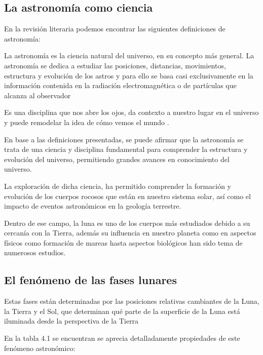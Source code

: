 \subsection{La astronomía como ciencia}

En la revisión literaria podemos encontrar las siguientes definiciones de astronomía:

La astronomía es la ciencia natural del universo, en su
concepto más general. La astronomía
se dedica a estudiar las posiciones, distancias, movimientos, estructura y evolución de los astros y para ello se basa casi exclusivamente en la información
contenida en la radiación electromagnética o de partículas que alcanza al observador \cite{conceptos2009}


Es una disciplina que nos abre los ojos, da contexto a nuestro lugar en el universo y puede remodelar la idea de cómo vemos el mundo \cite{iau2025}.

En base a las definiciones presentadas, se puede afirmar que la astronomía se trata de una ciencia y disciplina fundamental
para comprender la estructura y evolución del universo, permitiendo grandes avances en conocimiento del universo.

La exploración de dicha ciencia, ha permitido comprender la formación y evolución de los cuerpos rocosos que están en nuestro sistema solar, así como el impacto de eventos astronómicos en la geología terrestre.

Dentro de ese campo, la luna es uno de los cuerpos más estudiados debido a su cercanía con la Tierra, además su influencia en nuestro planeta
como en aspectos físicos como formación de mareas hasta aspectos biológicos han sido tema de numerosos estudios.

\subsection{El fenómeno de las fases lunares}


Estas fases están determinadas por las posiciones relativas cambiantes de la Luna, la Tierra y el Sol, que determinan qué parte de la superficie de la Luna está iluminada desde la perspectiva de la Tierra \cite{gullari2025}

En la tabla 4.1 se encuentran se aprecia detalladamente propiedades de este fenómeno astronómico:

